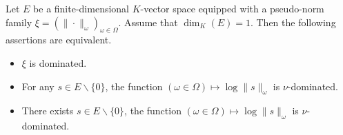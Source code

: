 \documentclass [11pt,reqno]{amsart}
\newcommand{\1}{\mathmybb{1}}
\def\setminus{\smallsetminus}
\begin{document}
\begin{proposition}
\label{prop:dominated_pseud-norm_family_dimension_1}
Let $E$ be a finite-dimensional $K$-vector space equipped with a pseudo-norm family $\xi =(\|\cdot\|_\omega)_{\omega\in \Omega}$. Assume that $\dim_{K}(E) = 1$. Then the following assertions are equivalent.
\begin{itemize}
	\item[(i)] $\xi$ is dominated.
	\item[(ii)] For any $s\in E\setminus\{0\}$, the function $(\omega\in\Omega)\mapsto\log\|s\|_{\omega}$ is $\nu$-dominated.
	\item[(iii)] There exists $s\in E\setminus\{0\}$, the function $(\omega\in\Omega)\mapsto\log\|s\|_{\omega}$ is $\nu$-dominated.
\end{itemize}
\end{proposition}

\end{document}
